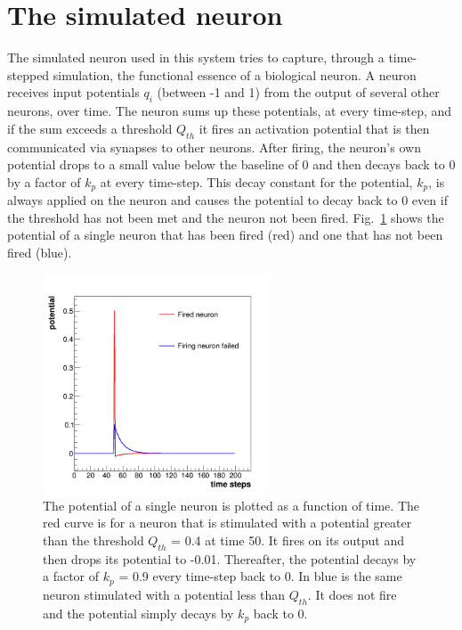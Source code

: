 \section{The simulated neuron}

The simulated neuron used in this system tries to capture, through a time-stepped simulation, the functional essence of a biological neuron. A neuron receives input potentials $q_i$ (between -1 and 1) from the output of several other neurons, over time. The neuron sums up these potentials, at every time-step, and if the sum exceeds a threshold $Q_{th}$ it fires an activation potential that is then communicated via synapses to other neurons. After firing, the neuron's own potential drops to a small value below the baseline of 0 and then decays back to 0 by a factor of $k_p$ at every time-step. This decay constant for the potential, $k_p$, is always applied on the neuron and causes the potential to decay back to 0 even if the threshold has not been met and the neuron not been fired. Fig.~\ref{fig:c_potential_time} shows the potential of a single neuron that has been fired (red) and one that has not been fired (blue).

\begin{figure}[thp]
\centering
\includegraphics[width=0.6\textwidth]{c_potential_time.png}
\caption{The potential of a single neuron is plotted as a function of time. The red curve is for a neuron that is stimulated with a potential greater than the threshold $Q_{th}$ = 0.4 at time 50. It fires on its output and then drops its potential to -0.01. Thereafter, the potential decays by a factor of $k_p$ = 0.9 every time-step back to 0. In blue is the same neuron stimulated with a potential less than $Q_{th}$. It does not fire and the potential simply decays by $k_p$ back to 0.}
\label{fig:c_potential_time}
\end{figure}

